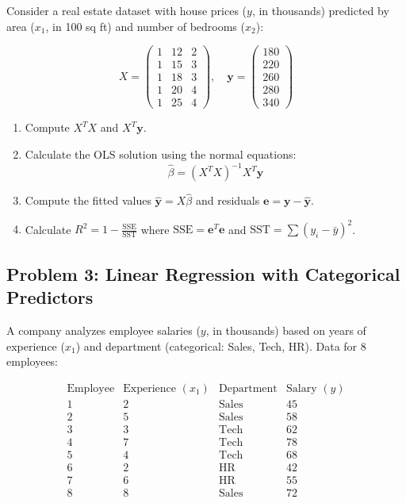 \documentclass[12pt]{article}
\begin{document}
Consider a real estate dataset with house prices (\(y\), in thousands) predicted by area (\(x_1\), in 100 sq ft) and number of bedrooms (\(x_2\)):

\[
X = \begin{pmatrix}
1 & 12 & 2 \\
1 & 15 & 3 \\
1 & 18 & 3 \\
1 & 20 & 4 \\
1 & 25 & 4
\end{pmatrix}, \quad
\mathbf{y} = \begin{pmatrix} 180 \\ 220 \\ 260 \\ 280 \\ 340 \end{pmatrix}
\]

\begin{enumerate}[label=(\alph*)]
\item Compute \(X^TX\) and \(X^T\mathbf{y}\).

\item Calculate the OLS solution using the normal equations:
\[
\hat{\beta} = (X^TX)^{-1}X^T\mathbf{y}
\]

\item Compute the fitted values \(\hat{\mathbf{y}} = X\hat{\beta}\) and residuals \(\mathbf{e} = \mathbf{y} - \hat{\mathbf{y}}\).

\item Calculate \(R^2 = 1 - \frac{\text{SSE}}{\text{SST}}\) where \(\text{SSE} = \mathbf{e}^T\mathbf{e}\) and \(\text{SST} = \sum(y_i - \bar{y})^2\).
\end{enumerate}

\subsection*{Problem 3: Linear Regression with Categorical Predictors}

A company analyzes employee salaries (\(y\), in thousands) based on years of experience (\(x_1\)) and department (categorical: Sales, Tech, HR). Data for 8 employees:

\[
\begin{array}{c|c|c|c}
\text{Employee} & \text{Experience } (x_1) & \text{Department} & \text{Salary } (y) \\
\hline
1 & 2 & \text{Sales} & 45 \\
2 & 5 & \text{Sales} & 58 \\
3 & 3 & \text{Tech} & 62 \\
4 & 7 & \text{Tech} & 78 \\
5 & 4 & \text{Tech} & 68 \\
6 & 2 & \text{HR} & 42 \\
7 & 6 & \text{HR} & 55 \\
8 & 8 & \text{Sales} & 72
\end{array}
\]
\end{document}
